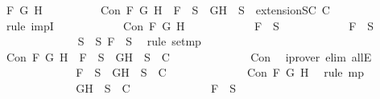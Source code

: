 \begin{isabellebody}
\ F\ G\ H\isanewline
\ \ \ \ \ \ \ \ \isamarkupfalse%
\ {\isachardoublequoteopen}Con\ F\ G\ H\ {\isasymlongrightarrow}\ F\ {\isasymin}\ S{\isacharprime}\ {\isasymlongrightarrow}\ {\isacharbraceleft}G{\isacharcomma}H{\isacharbraceright}\ {\isasymunion}\ S{\isacharprime}\ {\isasymin}\ {\isacharparenleft}extensionSC\ C{\isacharparenright}{\isachardoublequoteclose}\isanewline
\ \ \ \ \ \ \ \ \isamarkupfalse%
\ {\isacharparenleft}rule\ impI{\isacharparenright}{\isacharplus}\isanewline
\ \ \ \ \ \ \ \ \ \ \isamarkupfalse%
\ {\isachardoublequoteopen}Con\ F\ G\ H{\isachardoublequoteclose}\isanewline
\ \ \ \ \ \ \ \ \ \ \isamarkupfalse%
\ {\isachardoublequoteopen}F\ {\isasymin}\ S{\isacharprime}{\isachardoublequoteclose}\isanewline
\ \ \ \ \ \ \ \ \ \ \isamarkupfalse%
\ {\isachardoublequoteopen}F\ {\isasymin}\ S{\isachardoublequoteclose}\isanewline
\ \ \ \ \ \ \ \ \ \ \ \ \isamarkupfalse%
\ {\isacartoucheopen}S{\isacharprime}\ {\isasymsubseteq}\ S{\isacartoucheclose}\ {\isacartoucheopen}F\ {\isasymin}\ S{\isacharprime}{\isacartoucheclose}\ \isamarkupfalse%
\ {\isacharparenleft}rule\ set{\isacharunderscore}mp{\isacharparenright}\isanewline
\ \ \ \ \ \ \ \ \ \ \isamarkupfalse%
\ {\isachardoublequoteopen}Con\ F\ G\ H\ {\isasymlongrightarrow}\ F\ {\isasymin}\ S\ {\isasymlongrightarrow}\ {\isacharbraceleft}G{\isacharcomma}H{\isacharbraceright}\ {\isasymunion}\ S\ {\isasymin}\ C{\isachardoublequoteclose}\isanewline
\ \ \ \ \ \ \ \ \ \ \ \ \isamarkupfalse%
\ Con\ \isamarkupfalse%
\ {\isacharparenleft}iprover\ elim{\isacharcolon}\ allE{\isacharparenright}\isanewline
\ \ \ \ \ \ \ \ \ \ \isamarkupfalse%
\ \isamarkupfalse%
\ {\isachardoublequoteopen}F\ {\isasymin}\ S\ {\isasymlongrightarrow}\ {\isacharbraceleft}G{\isacharcomma}H{\isacharbraceright}\ {\isasymunion}\ S\ {\isasymin}\ C{\isachardoublequoteclose}\isanewline
\ \ \ \ \ \ \ \ \ \ \ \ \isamarkupfalse%
\ {\isacartoucheopen}Con\ F\ G\ H{\isacartoucheclose}\ \isamarkupfalse%
\ {\isacharparenleft}rule\ mp{\isacharparenright}\isanewline
\ \ \ \ \ \ \ \ \ \ \isamarkupfalse%
\ \isamarkupfalse%
\ {\isachardoublequoteopen}{\isacharbraceleft}G{\isacharcomma}H{\isacharbraceright}\ {\isasymunion}\ S\ {\isasymin}\ C{\isachardoublequoteclose}\isanewline
\ \ \ \ \ \ \ \ \ \ \ \ \isamarkupfalse%
\ {\isacartoucheopen}F\ {\isasymin}\ S{\isacartoucheclose}\ \isamarkupfalse%

\end{isabellebody}
